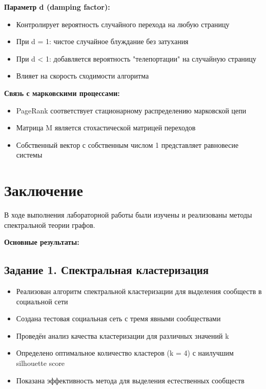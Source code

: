 \textbf{Параметр d (damping factor):}
\begin{itemize}
    \item Контролирует вероятность случайного перехода на любую страницу
    \item При d = 1: чистое случайное блуждание без затухания
    \item При d < 1: добавляется вероятность "телепортации" на случайную страницу
    \item Влияет на скорость сходимости алгоритма
\end{itemize}

\textbf{Связь с марковскими процессами:}
\begin{itemize}
    \item PageRank соответствует стационарному распределению марковской цепи
    \item Матрица M является стохастической матрицей переходов
    \item Собственный вектор с собственным числом 1 представляет равновесие системы
\end{itemize}

\section*{Заключение}

В ходе выполнения лабораторной работы были изучены и реализованы методы спектральной теории графов.

\textbf{Основные результаты:}

\subsection*{Задание 1. Спектральная кластеризация}

\begin{itemize}
    \item Реализован алгоритм спектральной кластеризации для выделения сообществ в социальной сети
    \item Создана тестовая социальная сеть с тремя явными сообществами
    \item Проведён анализ качества кластеризации для различных значений k
    \item Определено оптимальное количество кластеров (k = 4) с наилучшим silhouette score
    \item Показана эффективность метода для выделения естественных сообществ
\end{itemize}

